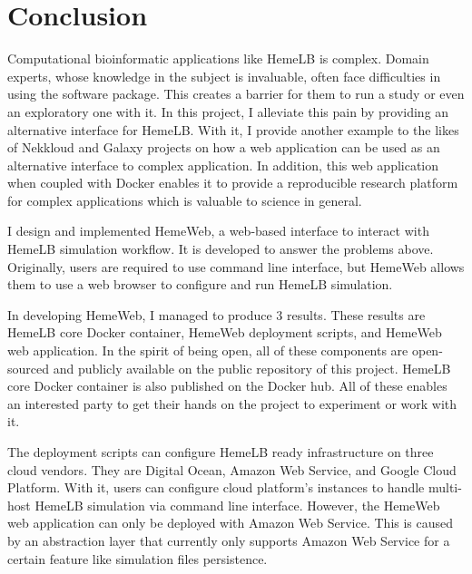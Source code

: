  

\chapter[Conclusion]{Conclusion}


Computational bioinformatic applications like HemeLB is complex. Domain experts, whose knowledge in the subject is invaluable, often face difficulties in using the software package. This creates a barrier for them to run a study or even an exploratory one with it. In this project, I  alleviate this pain by providing an alternative interface for HemeLB. With it, I provide another example to the likes of Nekkloud and Galaxy projects on how a web application can be used as an alternative interface to complex application. In addition, this web application when coupled with Docker enables it to provide a reproducible research platform for complex applications which is valuable to science in general.


I design and implemented HemeWeb, a web-based interface to interact with HemeLB simulation workflow. It is developed to answer the problems above. Originally, users are required to use command line interface, but HemeWeb allows them to use a web browser to configure and run HemeLB simulation. 

In developing HemeWeb, I managed to produce 3 results. These results are HemeLB core Docker container, HemeWeb deployment scripts, and HemeWeb web application. In the spirit of being open, all of these components are open-sourced and publicly available on the public repository of this project. HemeLB core Docker container is also published on the Docker hub. All of these enables an interested party to get their hands on the project to experiment or work with it.

The deployment scripts can configure HemeLB ready infrastructure on three cloud vendors. They are Digital Ocean, Amazon Web Service, and Google Cloud Platform. With it, users can configure cloud platform's instances to handle multi-host HemeLB simulation via command line interface. However, the HemeWeb web application can only be deployed with Amazon Web Service. This is caused by an abstraction layer that currently only supports Amazon Web Service for a certain feature like simulation files persistence.


